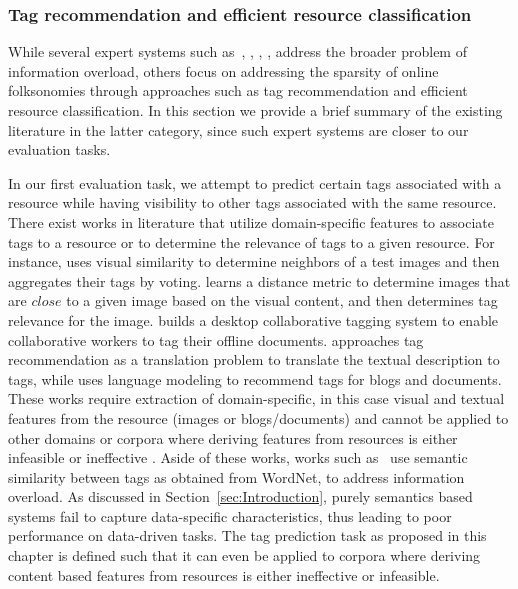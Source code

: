 {\subsubsection{Tag recommendation and efficient resource classification} 

While several expert systems such as~\cite{DeepaFolkso14}, \cite{ShuhuiAuthor15}, \cite{ZhengRecom10}, \cite{MohdSemantic13}, \cite{HyunwooFrame14} address the broader problem of information overload, others focus on addressing the sparsity of online folksonomies through approaches such as tag recommendation and efficient resource classification. In this section we provide a brief summary of the existing literature in the latter category, since such expert systems are closer to our evaluation tasks. 


In our first evaluation task, we attempt to predict certain tags associated with a resource while having visibility to other tags associated with the same resource. There exist works in literature that utilize domain-specific features to associate tags to a resource or to determine the relevance of tags to a given resource. For instance, {\cite{li2009learning}} uses visual similarity to determine neighbors of a test images and then aggregates their tags by voting. {\cite{wu2009distance}} learns a distance metric to determine images that are $close$ to a given image based on the visual content, and then determines tag relevance for the image. \cite{HsiehCollab09} builds a desktop collaborative tagging system to enable collaborative workers to tag their offline documents. \cite{ChenEstim15} approaches tag recommendation as a translation problem to translate the textual description to tags, while \cite{SunLang11} uses language modeling to recommend tags for blogs and documents. These works require extraction of domain-specific, in this case visual and textual features from the resource (images or blogs/documents) and cannot be applied to other domains or corpora where deriving features from resources is either infeasible or ineffective {\cite{huang2010text}\cite{song2010taxonomic}\cite{zanetti2008walk}\cite{yin2009exploring}}.
Aside of these works, works such as~\cite{MohdSemantic13} use semantic similarity between tags as obtained from WordNet, to address information overload. As discussed in Section~\ref{sec:Introduction}, purely semantics based systems fail to capture data-specific characteristics, thus leading to poor performance on data-driven tasks. 
The tag prediction task as proposed in this chapter is defined such that it can even be applied to corpora where deriving content based features from resources is either ineffective or infeasible.
}
